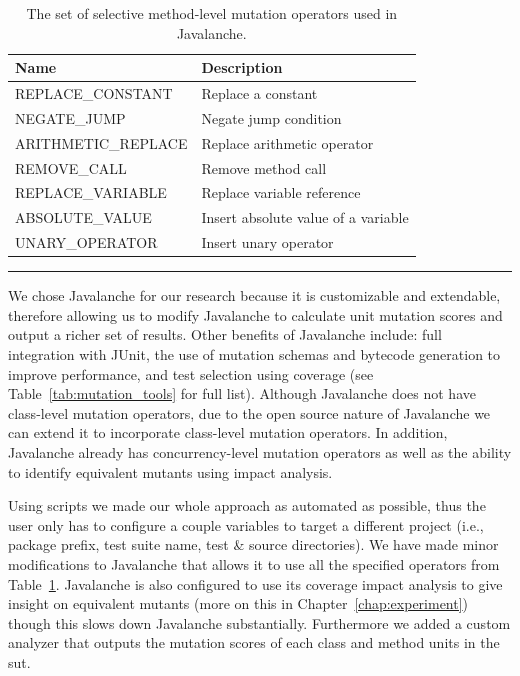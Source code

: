 \begin{table}[t]
  \centering
  \begin{tabular}{|l|l|}
    \hline
    \rowcolor[RGB]{169,196,223}
    \textbf{Name} & \textbf{Description} \\
    \hline REPLACE\_CONSTANT & Replace a constant \\
    \hline NEGATE\_JUMP & Negate jump condition \\
    \hline ARITHMETIC\_REPLACE & Replace arithmetic operator \\
    \hline REMOVE\_CALL & Remove method call \\
    \hline REPLACE\_VARIABLE & Replace variable reference\\
    \hline ABSOLUTE\_VALUE & Insert absolute value of a variable \\
    \hline UNARY\_OPERATOR & Insert unary operator \\
    \hline
  \end{tabular}
  \caption{The set of selective method-level mutation operators used in Javalanche.}
  \label{tab:javalanche_operators}
  \vspace{2mm}
  \hrule
\end{table}

We chose Javalanche for our research because it is customizable and extendable, therefore allowing us to modify Javalanche to calculate unit mutation scores and output a richer set of results. Other benefits of Javalanche include: full integration with JUnit, the use of mutation schemas and bytecode generation to improve performance, and test selection using coverage (see Table~\ref{tab:mutation_tools} for full list). Although Javalanche does not have class-level mutation operators, due to the open source nature of Javalanche we can extend it to incorporate class-level mutation operators. In addition, Javalanche already has concurrency-level mutation operators as well as the ability to identify equivalent mutants using impact analysis.

Using scripts we made our whole approach as automated as possible, thus the user only has to configure a couple variables to target a different project (i.e., package prefix, test suite name, test \& source directories). We have made minor modifications to Javalanche that allows it to use all the specified operators from Table~\ref{tab:javalanche_operators}. Javalanche is also configured to use its coverage impact analysis to give insight on equivalent mutants (more on this in Chapter~\ref{chap:experiment}) though this slows down Javalanche substantially. Furthermore we added a custom analyzer that outputs the mutation scores of each class and method units in the \gls{sut}.

